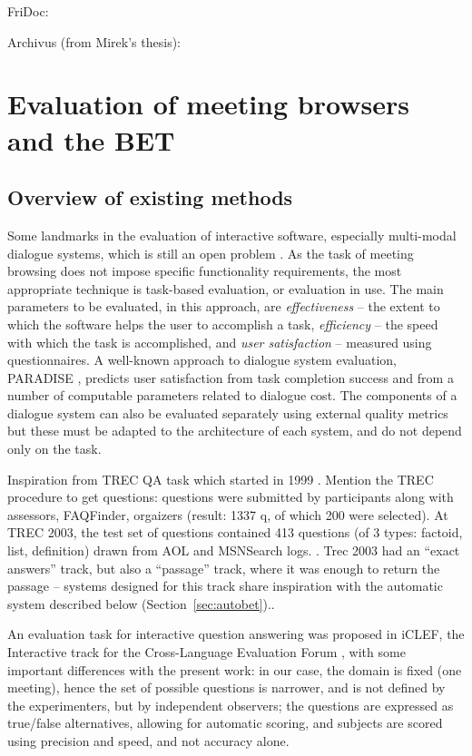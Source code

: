 \documentclass[11pt]{article}
\begin{document}
FriDoc: \cite{rigamonti06}

Archivus (from Mirek's thesis): \cite{Ailomaa2006,Melichar2008} %


\section{Evaluation of meeting browsers and the BET}
\label{sec:eval}

\subsection{Overview of existing methods}

Some landmarks in the evaluation of interactive software, especially multi-modal dialogue systems, which is still an open problem \cite{gib00,mol02,dyb04}.  As the task of meeting browsing does not impose specific functionality requirements, the most appropriate technique is task-based evaluation, or evaluation in use.
The main parameters to be evaluated, in this approach, are {\it effectiveness} -- the extent to which the software helps the user to accomplish a task, {\it efficiency} -- the speed with which the task is accomplished, and {\it user satisfaction} -- measured using questionnaires.
A well-known approach to dialogue system evaluation, PARADISE \cite{wal97}, predicts user satisfaction from task completion success and from a number of computable parameters related to dialogue cost.  The components of a dialogue system can also be evaluated separately using external quality metrics \cite{tra04} but these must be adapted to the architecture of each system, and do not depend only on the task. 
 
Inspiration from TREC QA task which started in 1999 \cite{Voorhees1999,Voorhees2001}. Mention the TREC procedure to get questions: questions were submitted by participants along with assessors, FAQFinder, orgaizers (result: 1337 q, of which 200 were selected).  At TREC 2003, the test set of questions contained 413 questions (of 3 types: factoid, list, definition) drawn from AOL and MSNSearch logs. \cite{Voorhees2003}.  Trec 2003 had an ``exact answers'' track, but also a ``passage'' track, where it was enough to return the passage -- systems designed for this track share inspiration with the automatic system described below (Section~\ref{sec:autobet})..

An evaluation task for interactive question answering was proposed in iCLEF, the Interactive track for the Cross-Language Evaluation Forum \cite{gon05}, with some important differences with the present work: in our case, the domain is fixed (one meeting), hence the set of possible questions is narrower, and is not defined by the experimenters, but by independent observers; the questions are expressed as true/false alternatives, allowing for automatic scoring, and subjects are scored using precision and speed, and not accuracy alone.
\end{document}
